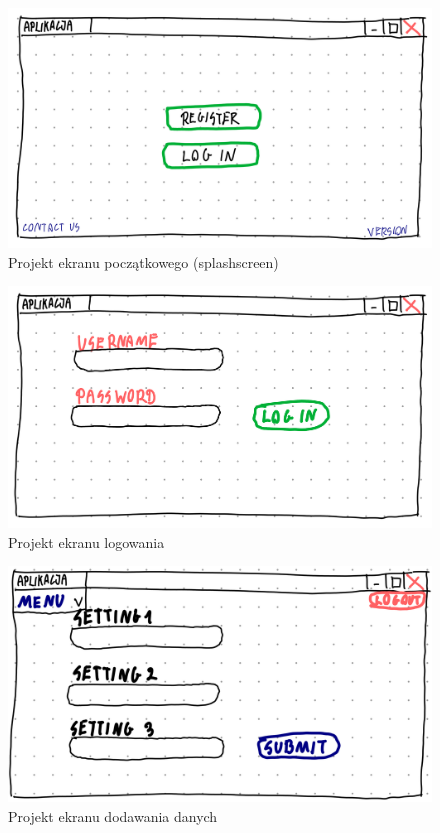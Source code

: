 \documentclass[a4paper,10pt, twoside]{report}
\begin{document}
\begin{large}
\begin{figure}[H]           %
    \centering
    \includegraphics[width=12cm]{figures/Righten_UI_sketch_startscreen.png}
    \caption{Projekt ekranu początkowego (splashscreen)}
    \label{fig:uiprojectsplash}
\end{figure}

\begin{figure}[H]           %
    \centering
    \includegraphics[width=12cm]{figures/Righten_UI_sketch_loginscreen.png}
    \caption{Projekt ekranu logowania}
    \label{fig:uiprojectlogin}
\end{figure}

\begin{figure}[H]           %
    \centering
    \includegraphics[width=12cm]{figures/Righten_UI_sketch_settings.png}
    \caption{Projekt ekranu dodawania danych}
    \label{fig:uiprojectsettings}
\end{figure}


\end{large}
\end{document}
